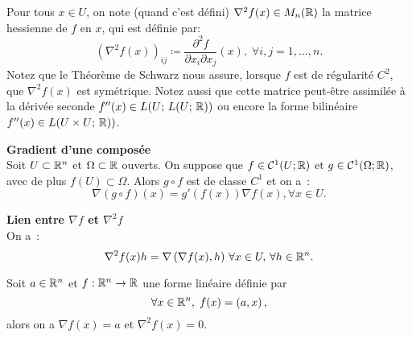 \begin{notation}
Pour tous \(x\in U\), on note (quand c'est défini) \(\nabla^2 f(x)\in M_n(\mathbb{R})\) la matrice hessienne de \(f\) en \(x\), qui est définie par:
\begin{equation*}
\left(\nabla^2 f(x)\right)_{ij} \coloneqq  \frac{\partial^2 f}{\partial x_i \partial x_j}(x),\;\forall i,j =1,\hdots,n.
\end{equation*}
Notez que le Théorème de Schwarz nous assure, lorsque \(f\) est de régularité \(C^2\), que \(\nabla^2 f(x)\) est symétrique. Notez aussi que cette matrice peut-être assimilée à la dérivée seconde \(f''(x)\in L(U;\,L(U;\,\mathbb{R})
)\) ou encore la forme bilinéaire \(f''(x)\in L(U\times U;\,\mathbb{R})
)\).
\end{notation}

\begin{proposition}\label{taf2}\textbf{Gradient d'une composée}\\
Soit \(U\subset \mathbb{R}^n\) et \(\Omega\subset\mathbb{R}\) ouverts. On suppose que \(f\in\mathcal{C}^1(U; \mathbb{R})\) et \(g\in\mathcal{C}^1(\Omega; \mathbb{R})\), avec de plus \(f(U)\subset\Omega\). Alors \(g\circ f\) est de classe \(C^1\) et on a~:
\begin{equation*}
\nabla (g\circ f)(x) = g'(f(x))\nabla f(x), \forall x\in U.
\end{equation*}

\end{proposition}

\vspace{0.3cm}
\begin{proposition}\label{taf3}\textbf{Lien entre \(\nabla f\) et \(\nabla^2 f\)}\\
On a~:
\begin{equation*}
\nabla^2 f(x)h = \nabla\left(\nabla f(x),h\right)\, \forall x\in U,\, \forall h\in\mathbb{R}^n.
\end{equation*}
\end{proposition}

\vspace{0.3cm}
\begin{exemple}
Soit \(a\in\mathbb{R}^n\) et \(f:\mathbb{R}^n\to\mathbb{R}\) une forme linéaire définie par 
\begin{equation*}
\forall x\in\mathbb{R}^n,\; f(x) = \left( a,x\right),
\end{equation*}
alors on a \(\nabla f(x) = a\) et \(\nabla^2 f(x) = 0\).\\
\end{exemple}

